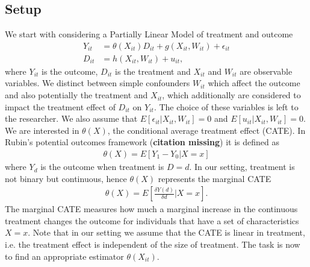 \subsection{Setup} \label{sec:dml-idea}
We start with considering a Partially Linear Model of treatment and outcome 
\begin{align}
    Y_{it}&=\theta(X_{it})D_{it}+g(X_{it}, W_{it})+\epsilon_{it} \label{eq:plm1}\\
    D_{it}&=h(X_{it}, W_{it})+u_{it}, \label{eq:plm2}
\end{align}
where $Y_{it}$ is the outcome, $D_{it}$ is the treatment and $X_{it}$ and $W_{it}$ are observable variables. We distinct between simple confounders $W_{it}$ which affect the outcome and also potentially the treatment and $X_{it}$, which additionally are considered to impact the treatment effect of $D_{it}$ on $Y_{it}$. The choice of these variables is left to the researcher. We also assume that $E[\epsilon_{it}|X_{it}, W_{it}]=0$ and $E[u_{it}|X_{it}, W_{it}]=0$. \\ 
We are interested in $\theta(X)$, the conditional average treatment effect (CATE). In Rubin's potential outcomes framework (\textbf{citation missing}) it is defined as 
\begin{align*}
    \theta(X)=E[Y_1 - Y_0 | X=x]
\end{align*}
where $Y_d$ is the outcome when treatment is $D=d$. In our setting, treatment is not binary but continuous, hence $\theta(X)$ represents the marginal CATE
\begin{align*}
    \theta(X)=E\left[\frac{\delta Y(d)}{\delta d} \bigg| X=x\right].
\end{align*}
The marginal CATE measures how much a marginal increase in the continuous treatment changes the outcome for individuals that have a set of characteristics $X=x$. Note that in our setting we assume that the CATE is linear in treatment, i.e. the treatment effect is independent of the size of treatment. The task is now to find an appropriate estimator ${\theta}(X_{it})$.

